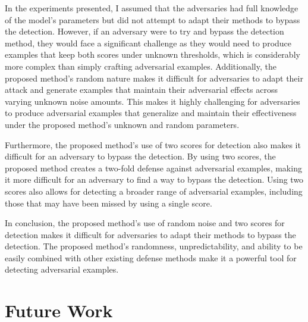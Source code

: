 In the experiments presented, I assumed that the adversaries had full knowledge
of the model's parameters but did not attempt to adapt their methods to bypass
the detection. However, if an adversary were to try and bypass the detection
method, they would face a significant challenge as they would need to produce
examples that keep both scores under unknown thresholds, which is considerably
more complex than simply crafting adversarial examples. Additionally, the
proposed method's random nature makes it difficult for adversaries to adapt
their attack and generate examples that maintain their adversarial effects
across varying unknown noise amounts. This makes it highly challenging for
adversaries to produce adversarial examples that generalize and maintain their
effectiveness under the proposed method's unknown and random parameters.

Furthermore, the proposed method's use of two scores for detection also makes it
difficult for an adversary to bypass the detection. By using two scores, the
proposed method creates a two-fold defense against adversarial examples, making
it more difficult for an adversary to find a way to bypass the detection. Using
two scores also allows for detecting a broader range of adversarial examples,
including those that may have been missed by using a single score.

In conclusion, the proposed method's use of random noise and two scores for
detection makes it difficult for adversaries to adapt their methods to bypass
the detection. The proposed method's randomness, unpredictability, and ability
to be easily combined with other existing defense methods make it a powerful
tool for detecting adversarial examples.


\clearpage
\section{Future Work}

